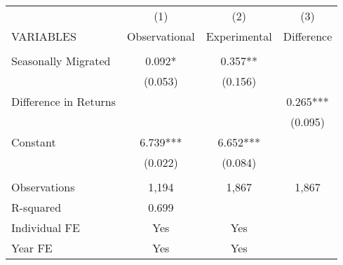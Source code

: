\begin{tabular}{lccc} \hline
 & (1) & (2) & (3) \\
VARIABLES & Observational & Experimental & Difference \\ \hline
 &  &  &  \\
Seasonally Migrated & 0.092* & 0.357** &  \\
 & (0.053) & (0.156) &  \\
Difference in Returns &  &  & 0.265*** \\
 &  &  & (0.095) \\
Constant & 6.739*** & 6.652*** &  \\
 & (0.022) & (0.084) &  \\
 &  &  &  \\
Observations & 1,194 & 1,867 & 1,867 \\
R-squared & 0.699 &  &  \\
Individual FE & Yes & Yes &  \\
 Year FE & Yes & Yes &  \\ \hline
\end{tabular}
